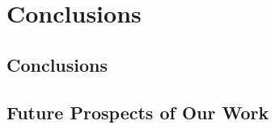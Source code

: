 \chapter{Conclusions}\label{ch:conclusion}

\section{Conclusions}


\section{Future Prospects of Our Work}
